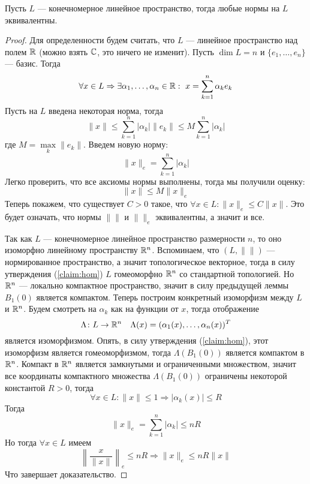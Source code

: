 \begin{claim}
	Пусть $L$ --- конечномерное линейное пространство, тогда любые нормы  на $L$ эквивалентны. 
\end{claim}
\begin{proof}
	Для определенности будем считать, что $L$ --- линейное пространство над полем $\mathbb{R}$ (можно взять $\mathbb{C}$, это ничего не изменит). Пусть $\dim L = n$ и $\{e_1, \dots, e_n\}$ --- базис. Тогда 
	$$
	\forall x \in L \Rightarrow \exists \alpha_1, \dots, \alpha_n \in \mathbb{R}: \ x = \sum_{k=1}^n \alpha_k e_k
	$$
	Пусть на $L$ введена некоторая норма, тогда 
	$$
	\|x\| \leq \sum_{k=1}^n|\alpha_k| \|e_k\| \leq M\sum_{k=1}^n |\alpha_k|
	$$
	где $M = \max\limits_{k} \|e_k\|$. Введем новую норму:
	$$
	\|x\|_e = \sum_{k=1}^n |\alpha_k|
	$$
	Легко проверить, что все аксиомы нормы выполнены, тогда мы получили оценку:
	$$
	\|x \| \leq M \|x\|_e
	$$
	Теперь покажем, что существует $C > 0$ такое, что $ \forall x \in L \colon \|x\|_e \leq C \|x\|$. Это будет означать, что нормы $\|\|$ и $\|\|_e$ эквивалентны, а значит и все. 
	
	Так как $L$ --- конечномерное линейное пространство размерности $n$, то оно изоморфно линейному пространству $\mathbb{R}^n$. Вспоминаем, что $(L, \|\|)$ --- нормированное пространство, а значит топологическое векторное, тогда в силу утверждения (\ref{claim:hom}) $L$ гомеоморфно $\mathbb{R}^n$ со стандартной топологией. Но $\mathbb{R}^n$ --- локально компактное пространство, значит в силу предыдущей леммы $B_1(0)$ является компактом. Теперь построим конкретный изоморфизм между $L$ и $\mathbb{R}^n$. Будем смотреть на $\alpha_k$ как на функции от $x$, тогда отображение 
	$$
	\Lambda \colon L \to \mathbb{R}^n \quad \Lambda(x) = (\alpha_1(x), \dots, \alpha_n(x))^T
	$$
	является изоморфизмом. Опять, в силу утверждения (\ref{claim:hom}), этот изоморфизм является гомеоморфизмом, тогда 	$\Lambda(B_1(0))$ является компактом в $\mathbb{R}^n$. Компакт в $\mathbb{R}^n$ является замкнутыми и ограниченными множеством, значит все координаты компактного множества $\Lambda(B_1(0))$ ограничены некоторой константой $R > 0$, тогда 
	$$
	\forall x \in L\colon \|x\| \leq 1 \Rightarrow |\alpha_k(x)| \leq R
	$$
	Тогда 
	$$
	\|x\|_e = \sum_{k=1}^n |\alpha_k| \leq n R
	$$
	Но тогда $\forall x \in L$ имеем
	$$
	\left\|\frac{x}{\|x\|}\right\|_e \leq nR \Rightarrow \|x\|_e \leq nR \|x\|
	$$
	Что завершает доказательство. 
\end{proof}
